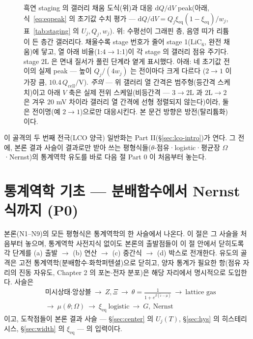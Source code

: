 \documentclass[11pt,a4paper]{article}
\newcommand{\dd}{\mathrm{d}}
\newcommand{\eq}{\mathrm{eq}}
\newcommand{\cell}{\mathrm{cell}}
\begin{document}
\begin{figure}[t]
\caption{흑연 staging 의 갤러리 채움 도식(위)과 대응 $\dd Q/\dd V$ peak(아래, 식~\eqref{eq:eqpeak} 의
초기값 수치 평가 --- $\dd Q/\dd V=Q_j\xi_\eq(1-\xi_\eq)/w_j$, 표~\ref{tab:staging} 의 $U_j,Q_j,w_j$).
위: 수평선이 그래핀 층, 음영 띠가 리튬이 든 층간 갤러리다. 채울수록 stage 번호가 줄어 stage 1($\mathrm{LiC_6}$,
완전 채움)에 닿고, 열 아래 비율(1:4$\to$1:1)이 각 stage 의 갤러리 점유 주기다. stage $2\mathrm L$ 은 면내 질서가
풀린 단계라 옅게 표시했다. 아래: 네 초기값 전이의 실제 peak --- 높이 $Q_j/(4w_j)$ 는 전이마다 크게 다르다
($2\to1$ 이 가장 큼, $10.4\,Q_\cell/$V). \emph{주의} --- 위 갤러리 열 간격은 범주형(등간격 스케치)이고 아래 $V$
축은 실제 전위 스케일(비등간격 --- $3\to2\mathrm L$ 과 $2\mathrm L\to2$ 은 겨우 $20$ mV 차이라 갤러리 열 간격에
선형 정렬되지 않는다)이라, 둘은 전이명(예 $2\to1$)으로만 대응시킨다. 본 문건 방향은 방전(탈리튬화)이다.}
\label{fig:staging}
\end{figure}

이 골격의 두 번째 전극(LCO 양극) 일반화는 Part II(\S\ref{sec:lco-intro})가 연다. 그 전에, 본론 결과 사슬이
결과로만 받아 쓰는 평형식들($\theta$-점유·logistic·평균장 $\Omega$·Nernst)의 통계역학 유도를 바로 다음 절
Part 0 이 처음부터 놓는다.

\section{통계역학 기초 --- 분배함수에서 Nernst 식까지 (P0)}\label{sec:sm-found}

본론(N1--N9)의 모든 평형식은 통계역학의 한 사슬에서 나온다. 이 절은 그 사슬을 처음부터 놓으며, 통계역학
사전지식 없이도 본론의 출발점들이 이 절 안에서 닫히도록 각 단계를 (a) 출발 $\to$ (b) 연산 $\to$ (c) 중간식
$\to$ (d) 박스로 전개한다. 유도의 골격은 고전 통계역학(분배함수$\cdot$화학퍼텐셜)으로 닫히고, 양자 통계가
필요한 항(점유 자리의 진동 자유도, Chapter 2 의 포논$\cdot$전자 분포)은 해당 자리에서 명시적으로 도입한다.
사슬은
\[
\boxed{\;\begin{aligned}
&\text{미시상태·앙상블}\ \to\ Z,\Xi\ \to\ \theta=\frac{1}{1+e^{\beta(\tilde\varepsilon-\mu)}}\ \to\ \text{lattice gas}\\
&\to\ \mu(\theta;\Omega)\ \to\ \xi_\eq\ \text{logistic}\ \to\ G,\ \text{Nernst}
\end{aligned}\;}
\]
이고, 도착점들이 본론 결과 사슬 --- \S\ref{sec:center} 의 $U_j(T)$, \S\ref{sec:hys} 의 히스테리시스,
\S\ref{sec:width} 의 $\xi_\eq$ --- 의 입력이다.
\end{document}
